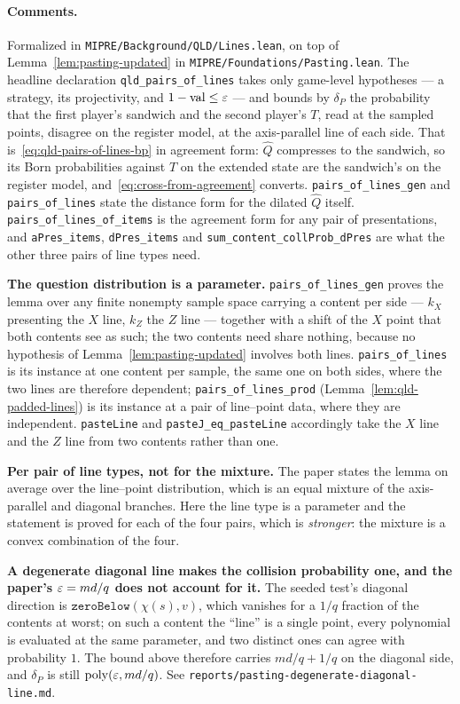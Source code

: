 \paragraph{Comments.} Formalized in \texttt{MIPRE/Background/QLD/Lines.lean}, on top of
Lemma~\ref{lem:pasting-updated} in \texttt{MIPRE/Foundations/Pasting.lean}. The headline declaration
\texttt{qld\_pairs\_of\_lines} takes only game-level hypotheses --- a strategy, its projectivity,
and $1 - \mathrm{val} \leq \varepsilon$ --- and bounds by $\delta_P$ the probability that the first player's
sandwich and the second player's $T$, read at the sampled points, disagree on the register model, at
the axis-parallel line of each side. That is~\eqref{eq:qld-pairs-of-lines-bp} in agreement form:
$\widehat{Q}$ compresses to the sandwich, so its Born probabilities against $T$ on the extended
state are the sandwich's on the register model, and~\eqref{eq:cross-from-agreement} converts.
\texttt{pairs\_of\_lines\_gen} and \texttt{pairs\_of\_lines} state the distance form for the dilated
$\widehat{Q}$ itself. \texttt{pairs\_of\_lines\_of\_items} is the agreement form for any pair of
presentations, and \texttt{aPres\_items}, \texttt{dPres\_items} and
\texttt{sum\_content\_collProb\_dPres} are what the other three pairs of line types need.

\textbf{The question distribution is a parameter.} \texttt{pairs\_of\_lines\_gen} proves the lemma
over any finite nonempty sample space carrying a content per side --- $k_X$ presenting the $X$ line,
$k_Z$ the $Z$ line --- together with a shift of the $X$ point that both contents see as such; the
two contents need share nothing, because no hypothesis of Lemma~\ref{lem:pasting-updated} involves
both lines. \texttt{pairs\_of\_lines} is its instance at one content per sample, the same one on
both sides, where the two lines are therefore dependent;
\texttt{pairs\_of\_lines\_prod} (Lemma~\ref{lem:qld-padded-lines}) is its instance at a pair of
line--point data, where they are independent. \texttt{pasteLine} and
\texttt{pasteJ\_eq\_pasteLine} accordingly take the $X$ line and the $Z$ line from two contents
rather than one.

\textbf{Per pair of line types, not for the mixture.} The paper states the lemma on average over
the line--point distribution, which is an equal mixture of the axis-parallel and diagonal
branches. Here the line type is a parameter and the statement is proved for each of the four
pairs, which is \emph{stronger}: the mixture is a convex combination of the four.

\textbf{A degenerate diagonal line makes the collision probability one, and the paper's
$\varepsilon = md/q$ does not account for it.} The seeded test's diagonal direction is
$\mathtt{zeroBelow}(\chi(s), v)$, which vanishes for a $1/q$ fraction of the contents at worst; on
such a content the ``line'' is a single point, every polynomial is evaluated at the same parameter,
and two distinct ones can agree with probability $1$. The bound above therefore carries
$md/q + 1/q$ on the diagonal side, and $\delta_P$ is still $\mathrm{poly}(\varepsilon, md/q)$. See
\texttt{reports/pasting-degenerate-diagonal-line.md}.


